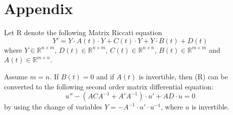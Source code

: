 \chapter*{Appendix}

Let R denote the following Matrix Riccati equation
\begin{equation}
\tag{R}
    Y' = Y\cdot A(t) \cdot Y + C(t)\cdot Y + Y\cdot B(t) + D(t)
\end{equation}
where $Y \in \mathbb{R}^{ n \times m}$, $D(t) \in \mathbb{R}^{ n \times m}$, $C(t) \in \mathbb{R}^{ n \times n}$, $B(t) \in \mathbb{R}^{m \times m}$ and $A(t) \in \mathbb{R}^{ m \times n}$.

\begin{namedtheorem}[Theorem 3.3.1]
Assume $m=n$. If $B(t) = 0$ and if $A(t)$ is invertible, then (R) can be converted to the following second order matrix differential equation:
\begin{equation}
\tag{E1}
    u'' - (ACA^{-1} + A'A^{-1})\cdot u' + AD \cdot u = 0
\end{equation}
by using the change of variables $Y = - A^{-1} \cdot u' \cdot u^{-1}$, where $u$ is invertible.
\end{namedtheorem}

